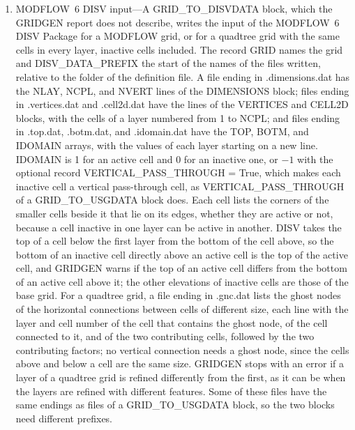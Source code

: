 \documentclass[11pt,twoside,twocolumn]{usgsreport}
\begin{document}
\begin{enumerate}
  \item MODFLOW~6 DISV input---A GRID\_TO\_DISVDATA block, which the GRIDGEN report does not describe, writes the input of the MODFLOW~6 DISV Package for a MODFLOW grid, or for a quadtree grid with the same cells in every layer, inactive cells included. The record GRID names the grid and DISV\_DATA\_PREFIX the start of the names of the files written, relative to the folder of the definition file. A file ending in .dimensions.dat has the NLAY, NCPL, and NVERT lines of the DIMENSIONS block; files ending in .vertices.dat and .cell2d.dat have the lines of the VERTICES and CELL2D blocks, with the cells of a layer numbered from 1 to NCPL; and files ending in .top.dat, .botm.dat, and .idomain.dat have the TOP, BOTM, and IDOMAIN arrays, with the values of each layer starting on a new line. IDOMAIN is 1 for an active cell and 0 for an inactive one, or $-1$ with the optional record VERTICAL\_PASS\_THROUGH = True, which makes each inactive cell a vertical pass-through cell, as VERTICAL\_PASS\_THROUGH of a GRID\_TO\_USGDATA block does. Each cell lists the corners of the smaller cells beside it that lie on its edges, whether they are active or not, because a cell inactive in one layer can be active in another. DISV takes the top of a cell below the first layer from the bottom of the cell above, so the bottom of an inactive cell directly above an active cell is the top of the active cell, and GRIDGEN warns if the top of an active cell differs from the bottom of an active cell above it; the other elevations of inactive cells are those of the base grid. For a quadtree grid, a file ending in .gnc.dat lists the ghost nodes of the horizontal connections between cells of different size, each line with the layer and cell number of the cell that contains the ghost node, of the cell connected to it, and of the two contributing cells, followed by the two contributing factors; no vertical connection needs a ghost node, since the cells above and below a cell are the same size. GRIDGEN stops with an error if a layer of a quadtree grid is refined differently from the first, as it can be when the layers are refined with different features. Some of these files have the same endings as files of a GRID\_TO\_USGDATA block, so the two blocks need different prefixes.

\end{enumerate}
\end{document}
